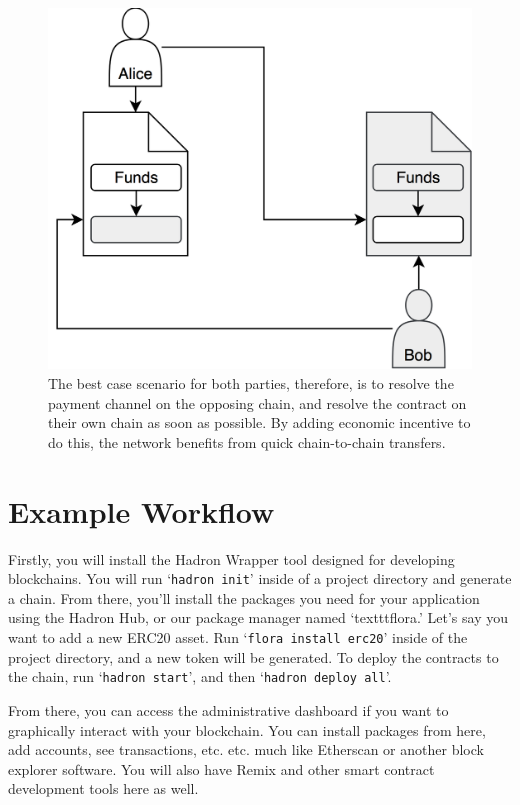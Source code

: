 \documentclass{%
	article}
\begin{document}
\begin{figure}[H]
\centering
\includegraphics[scale=0.112]{fig6.png}
\caption{\small\textnormal{The best case scenario for both parties, therefore, is to resolve the payment channel on the opposing chain, and resolve the contract on their own chain as soon as possible. By adding economic incentive to do this, the network benefits from quick chain-to-chain transfers.}}
\end{figure}

\section{Example Workflow}
Firstly, you will install the Hadron Wrapper tool designed for developing blockchains. You will run ‘\texttt{hadron init}' inside of a project directory and generate a chain. From there, you'll install the packages you need for your application using the Hadron Hub, or our package manager named ‘texttt{flora}.' Let's say you want to add a new ERC20 asset. Run ‘\texttt{flora install erc20}' inside of the project directory, and a new token will be generated. To deploy the contracts to the chain, run ‘\texttt{hadron start}', and then ‘\texttt{hadron deploy all}'.

From there, you can access the administrative dashboard if you want to graphically interact with your blockchain. You can install packages from here, add accounts, see transactions, etc. etc. much like Etherscan or another block explorer software. You will also have Remix and other smart contract development tools here as well.
\end{document}
